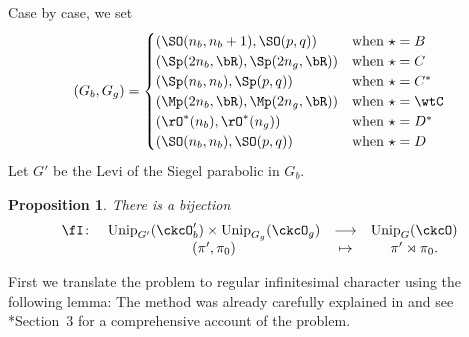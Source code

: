 \documentclass[12pt,a4paper]{amsart}
\numberwithin{equation}{section}
\newtheorem{prop}[thm]{Proposition}
\theoremstyle{remark}
\def\Unip{\mathrm{Unip}}
\begin{document}
Case by case,  we set
\[
  (G_{b},G_{g}) =
  \begin{cases}
    (\SO(n_{b},n_{b}+1),\SO(p,q)) & \text{when } \star = B \\
    (\Sp(2n_{b},\bR),\Sp(2n_{g},\bR)) & \text{when } \star = C \\
    (\Sp(n_{b},n_{b}), \Sp(p,q)) & \text{when } \star = C^{*} \\
    (\Mp(2n_{b},\bR),\Mp(2n_{g},\bR)) & \text{when } \star = \wtC \\
    (\rO^{*}(n_{b}), \rO^{*}(n_{g})) & \text{when } \star = D^{*} \\
    (\SO(n_{b},n_{b}), \SO(p,q) )& \text{when } \star = D \\
  \end{cases}
\]
Let $G'$ be the Levi of the Siegel parabolic in $G_{b}$.

\begin{prop}\label{prop:red}
  There is a bijection
  \begin{equation}\label{eq:IND}
      \begin{array}{rccc}
    \fI\colon &   \Unip_{G'}(\ckcO'_{b})\times \Unip_{G_{g}}(\ckcO_{g})&         \longrightarrow &\Unip_{G}(\ckcO) \\
     &   (\pi',\pi_{0}) & \mapsto & \pi'\rtimes \pi_{0}.
      \end{array}
    \end{equation}
  \end{prop}

First we translate the problem to
regular infinitesimal character using the following lemma:
 The method was already carefully explained in \cite{Mat} and see
\cite{GI}*{Section~3} for a comprehensive account of the problem.


\def\fhhaso{(\fhh^a_1)^*}
\def\fhhast{(\fhh^a_2)^*}
\newcommand{\ff}{f}
\newcommand{\ffcoh}{\varphi}
\end{document}
